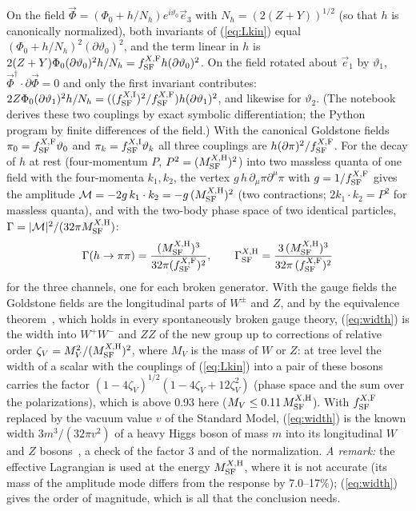 \documentclass[aps,prd,onecolumn,superscriptaddress,nofootinbib,floatfix,longbibliography]{revtex4-2}
\newcommand{\SF}{{\rm SF}}
\begin{document}
On the field $\vec\Phi=(\Phi_0+h/N_h)e^{i\vartheta_0}\vec e_3$ with $N_h=(2(Z+Y))^{1/2}$ (so that $h$ is canonically normalized), both invariants
of (\ref{eq:Lkin}) equal $(\Phi_0+h/N_h)^2(\partial\vartheta_0)^2$, and the term linear in $h$ is $2(Z+Y)\Phi_0(\partial\vartheta_0)^2h/N_h=
f^{X,{\rm F}}_\SF h(\partial\vartheta_0)^2$. On the field rotated about $\vec e_1$ by $\vartheta_1$, $\vec\Phi^\dagger\cdot\partial\vec\Phi=0$ and only the first
invariant contributes: $2Z\Phi_0(\partial\vartheta_1)^2h/N_h=((f^{X,{\rm I}}_\SF)^2/f^{X,{\rm F}}_\SF)h(\partial\vartheta_1)^2$, and likewise for $\vartheta_2$.
(The notebook derives these two couplings by exact symbolic differentiation; the Python program by finite differences of the field.)
With the canonical Goldstone fields $\pi_0=f^{X,{\rm F}}_\SF\vartheta_0$ and $\pi_k=f^{X,{\rm I}}_\SF\vartheta_k$ all three couplings are
$h(\partial\pi)^2/f^{X,{\rm F}}_\SF$. For the decay of $h$ at rest (four-momentum $P$, $P^2=(M^{X,{\rm H}}_\SF)^2$) into two massless quanta of one field
with the four-momenta $k_1,k_2$, the vertex $g\,h\,\partial_\mu\pi\partial^\mu\pi$ with $g=1/f^{X,{\rm F}}_\SF$ gives the amplitude
$\mathcal M=-2g\,k_1\cdot k_2=-g\,(M^{X,{\rm H}}_\SF)^2$ (two contractions; $2k_1\cdot k_2=P^2$ for massless quanta), and with the two-body phase space
of two identical particles, $\Gamma=|\mathcal M|^2/(32\pi M^{X,{\rm H}}_\SF)$:
\begin{equation}
\Gamma(h\to\pi\pi)=\frac{(M^{X,{\rm H}}_\SF)^3}{32\pi(f^{X,{\rm F}}_\SF)^2},\qquad\Gamma^{X,{\rm H}}_\SF=\frac{3\,(M^{X,{\rm H}}_\SF)^3}{32\pi\,(f^{X,{\rm F}}_\SF)^2}
\label{eq:width}
\end{equation}
for the three channels, one for each broken generator. With the gauge fields the Goldstone fields are the longitudinal parts of
$W^\pm$ and $Z$, and by the equivalence theorem~\cite{CLT1974,ChanowitzGaillard1985}, which holds in every spontaneously broken gauge
theory, (\ref{eq:width}) is the width into $W^+W^-$ and $ZZ$ of the new group up to corrections of relative order
$\zeta_V=M_V^2/(M^{X,{\rm H}}_\SF)^2$, where $M_V$ is the mass of $W$ or $Z$: at tree level the width of a scalar with the couplings of (\ref{eq:Lkin})
into a pair of these bosons carries the factor $(1-4\zeta_V)^{1/2}(1-4\zeta_V+12\zeta_V^2)$ (phase space and the sum over the polarizations), which
is above 0.93 here ($M_V\le0.11\,M^{X,{\rm H}}_\SF$). With $f^{X,{\rm F}}_\SF$ replaced by the vacuum value $v$
of the Standard Model, (\ref{eq:width}) is the known width $3m^3/(32\pi v^2)$ of a heavy Higgs boson of mass $m$ into its
longitudinal $W$ and $Z$ bosons~\cite{LQT1977}, a check of the factor 3 and of the normalization. \emph{A remark:} the effective
Lagrangian is used at the energy $M^{X,{\rm H}}_\SF$, where it is not accurate (its mass of the amplitude mode differs from the response
by 7.0\mbox{--}17\%); (\ref{eq:width}) gives the order of magnitude, which is all that the conclusion needs.
\end{document}
